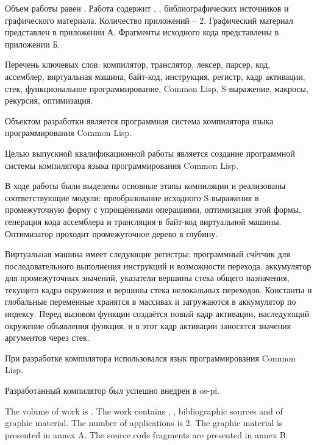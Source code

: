 
Объем работы равен . Работа содержит , ,  библиографических источников и  графического материала. Количество приложений -- 2. Графический материал представлен в приложении А. Фрагменты исходного кода представлены в приложении Б.

Перечень ключевых слов: компилятор, транслятор, лексер, парсер, код, ассемблер, виртуальная машина, байт-код, инструкция, регистр, кадр активации, стек, функциональное программирование, Common Lisp, S-выражение, макросы, рекурсия, оптимизация.

Объектом разработки является программная система компилятора языка программирования Common Lisp.

Целью выпускной квалификационной работы является создание программной системы компилятора языка программирования Common Lisp.

В ходе работы были выделены основные этапы компиляции и реализованы соответствующие модули: преобразование исходного S-выражения в промежуточную форму с упрощёнными операциями, оптимизация этой формы, генерация кода ассемблера и трансляция в байт-код виртуальной машины. Оптимизатор проходит промежуточное дерево в глубину.

Виртуальная машина имеет следующие регистры: программный счётчик для последовательного выполнения инструкций и возможности перехода, аккумулятор для промежуточных значений, указатели вершины стека общего назначения, текущего кадра окружения и вершины стека нелокальных переходов. Константы и глобальные переменные хранятся в массивах и загружаются в аккумулятор по индексу. Перед вызовом функции создаётся новый кадр активации, наследующий окружение объявления функция, и в этот кадр активации заносятся значения аргументов через стек.

При разработке компилятора использовался язык программирования Common Lisp.

Разработанный компилятор был успешно внедрен в os-pi.

  
The volume of work is . The work contains , ,  bibliographic sources and  of graphic material. The number of applications is 2. The graphic material is presented in annex A. The source code fragments are presented in annex B.

